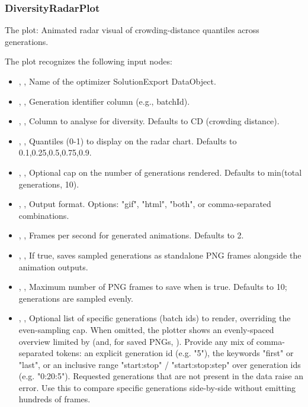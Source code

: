 \subsubsection{DiversityRadarPlot}
The   plot: Animated radar visual of crowding-distance quantiles across generations.

The  plot recognizes the following input nodes:
\begin{itemize}
  \item {}, , Name of the optimizer SolutionExport DataObject.
  \item {}, , Generation identifier column (e.g., batchId).
  \item {}, , Column to analyse for diversity. Defaults to CD (crowding distance).
  \item {}, , Quantiles (0-1) to display on the radar chart. Defaults to 0.1,0.25,0.5,0.75,0.9.
  \item {}, , Optional cap on the number of generations rendered. Defaults to min(total generations, 10).
  \item {}, , Output format. Options: "gif", "html", "both", or comma-separated combinations.
  \item {}, , Frames per second for generated animations. Defaults to 2.
  \item {}, , If true, saves sampled generations as standalone PNG frames alongside the animation outputs.
  \item {}, , Maximum number of PNG frames to save when  is true. Defaults to 10; generations are sampled evenly.
  \item {}, , Optional list of specific generations (batch ids) to render, overriding the even-sampling cap. When omitted, the plotter shows an evenly-spaced overview limited by  (and, for saved PNGs, ). Provide any mix of comma-separated tokens: an explicit generation id (e.g. "5"), the keywords "first" or "last", or an inclusive range "start:stop" / "start:stop:step" over generation ids (e.g. "0:20:5"). Requested generations that are not present in the data raise an error. Use this to compare specific generations side-by-side without emitting hundreds of frames.
\end{itemize}

